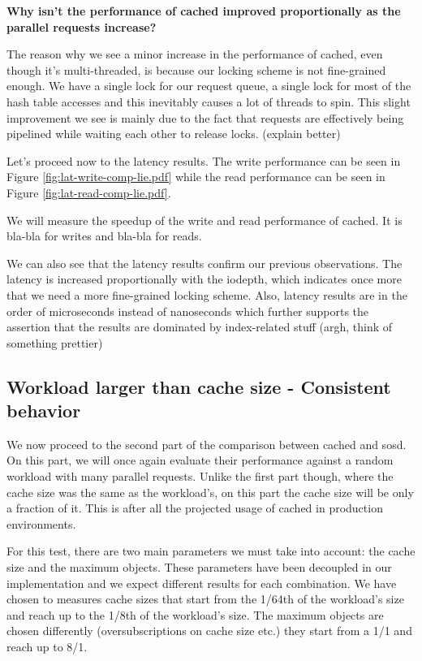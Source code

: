 \textbf{Why isn't the performance of cached improved proportionally as the 
	parallel requests increase?}

The reason why we see a minor increase in the performance of cached, even 
though it's multi-threaded, is because our locking scheme is not fine-grained 
enough. We have a single lock for our request queue, a single lock for most of 
the hash table accesses and this inevitably causes a lot of threads to spin.  
This slight improvement we see is mainly due to the fact that requests are 
effectively being pipelined while waiting each other to release locks. (explain 
better)

Let's proceed now to the latency results. The write performance can be seen in 
Figure \ref{fig:lat-write-comp-lie.pdf} while the read performance can be seen 
in Figure \ref{fig:lat-read-comp-lie.pdf}.


We will measure the speedup of the write and read performance of cached. It is 
bla-bla for writes and bla-bla for reads.

We can also see that the latency results confirm our previous observations. The 
latency is increased proportionally with the iodepth, which indicates once more 
that we need a more fine-grained locking scheme. Also, latency results are in 
the order of microseconds instead of nanoseconds which further supports the 
assertion that the results are dominated by index-related stuff (argh, think of 
something prettier)

\subsection{Workload larger than cache size - Consistent behavior}

We now proceed to the second part of the comparison between cached and sosd.  
On this part, we will once again evaluate their performance against a random 
workload with many parallel requests. Unlike the first part though, where the 
cache size was the same as the workload's, on this part the cache size will be 
only a fraction of it. This is after all the projected usage of cached in
production environments.

For this test, there are two main parameters we must take into account: the 
cache size and the maximum objects. These parameters have been decoupled in our 
implementation and we expect different results for each combination. We have 
chosen to measures cache sizes that start from the 1/64th of the workload's 
size and reach up to the 1/8th of the workload's size. The maximum objects are 
chosen differently (oversubscriptions on cache size etc.) they start from a 1/1 
and reach up to 8/1.

